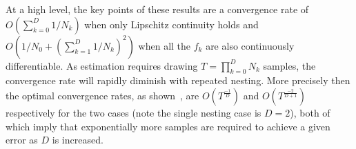 At a high level, the key points of these results are a convergence rate of $O(\sum_{k=0}^{D} 1/N_k)$
when only Lipschitz continuity holds and $O(1/N_0 +(\sum_{k=1}^{D} 1/N_k)^2)$ when
all the $f_k$ are also continuously differentiable.  
As estimation requires drawing $T = \prod_{k=0}^{D} N_k$ samples, 
the convergence rate will rapidly diminish with repeated nesting.  More precisely then the optimal convergence rates,
as shown~\cite{rainforth2017pitfalls}, are
$O(T^{\frac{-1}{D}})$ and $O(T^{\frac{-2}{D+1}})$ respectively for the two cases (note the single nesting case 
is $D=2$), both of which
imply that exponentially more samples are required to achieve a given error as $D$ is increased.
